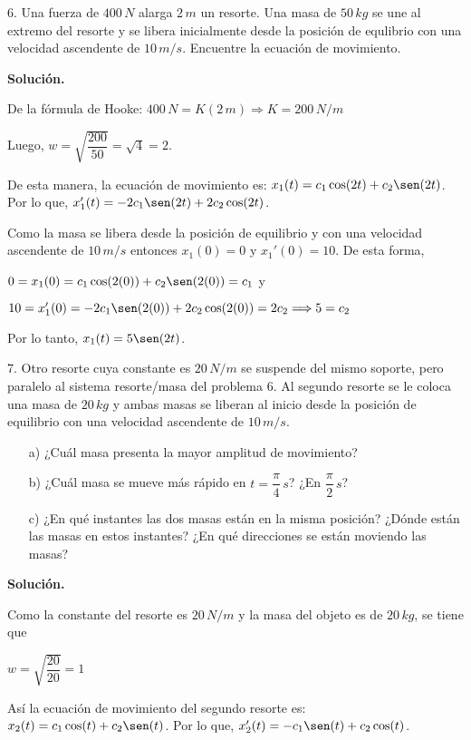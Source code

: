 \documentclass[fleqn]{article}
\begin{document}
    6. Una fuerza de $ 400 \, N $ alarga $2 \, m $ un resorte. Una masa de $ 50 \, kg $ se une al extremo del resorte y se libera inicialmente desde la posición de equlibrio con una velocidad ascendente de $ 10 \, m/s $. Encuentre la ecuación de movimiento.

    \textbf{Solución.}

    De la fórmula de Hooke: $ 400 \, N = K(2 \, m) \Longrightarrow K = 200 \, N/m $

    Luego, $ w = \sqrt{\dfrac{200}{50}} = \sqrt{4} = 2 $.

    De esta manera, la ecuación de movimiento es: $ x_1(t) = c_1 \cos (2t) + c_2 \sen(2t) $. Por lo que, $ x_1'(t) = -2c_1 \sen (2t) + 2c_2 \cos(2t) $.

    Como la masa se libera desde la posición de equilibrio y con una velocidad ascendente de $ 10 \, m/s $ entonces $ x_1(0) = 0 $ y $ x_1'(0) = 10 $. De esta forma,

    $ 0 = x_1(0) = c_1 \cos (2(0)) + c_2 \sen(2(0)) = c_1 $ y 

    $ 10 = x_1'(0) = -2c_1 \sen (2(0)) + 2c_2 \cos(2(0)) = 2c_2 \Longrightarrow 5 = c_2 $

    Por lo tanto, $ x_1(t) = 5 \sen (2t) $.

    7. Otro resorte cuya constante es $ 20 \, N/m $ se suspende del mismo soporte, pero paralelo al sistema resorte/masa del problema 6. Al segundo resorte se le coloca una masa de $ 20 \, kg $ y ambas masas se liberan al inicio desde la posición de equilibrio con una velocidad ascendente de $ 10 \, m/s $.

    \begin{enumerate}
            \item[a)] ¿Cuál masa presenta la mayor amplitud de movimiento?
            \item[b)] ¿Cuál masa se mueve más rápido en $ t = \dfrac{\pi}{4} \, s $? ¿En $ \dfrac{\pi}{2} \, s $?
            \item[c)] ¿En qué instantes las dos masas están en la misma posición? ¿Dónde están las masas en estos instantes? ¿En qué direcciones se están moviendo las masas?
    \end{enumerate}

    \textbf{Solución.}

    Como la constante del resorte es $ 20 \, N/m $ y la masa del objeto es de $ 20 \, kg $, se tiene que

    $ w = \sqrt{\dfrac{20}{20}} = 1 $

    Así la ecuación de movimiento del segundo resorte es: $ x_2(t) = c_1 \cos (t) + c_2 \sen(t) $. Por lo que, $ x_2'(t) = -c_1 \sen (t) + c_2 \cos(t) $.
\end{document}
